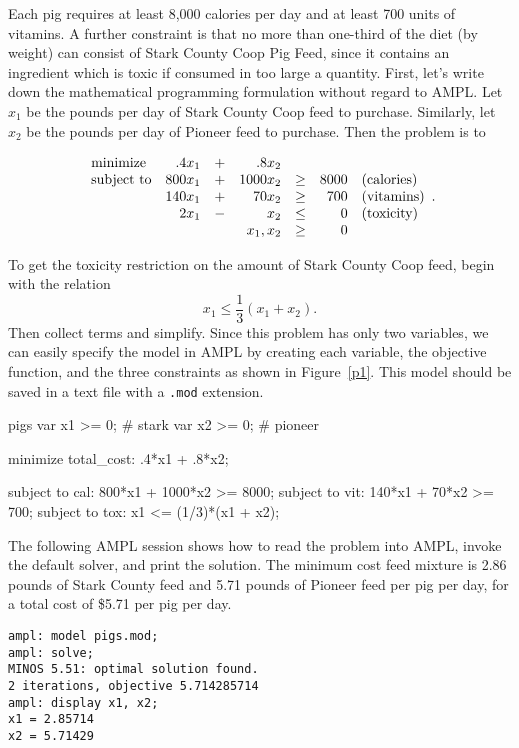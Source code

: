 Each pig requires at least 8,000 calories per day and at least 700
units of vitamins. A further constraint is that no more than one-third
of the diet (by weight) can consist of Stark County Coop Pig Feed,
since it contains an ingredient which is toxic if consumed in too
large a quantity.  First, let's write down the mathematical
programming formulation without regard to AMPL. Let $x_1$ be the
pounds per day of Stark County Coop feed to purchase. Similarly, let
$x_2$ be the pounds per day of Pioneer feed to purchase. Then the
problem is to 

\[
\begin{array}{lrrrrrl}
\textrm{minimize}   & .4x_1 & + & .8x_2 &  &  &  \\
\textrm{subject to} & 800x_1 & + & 1000x_2 & \geq & 8000 & \textrm{(calories)} \\
                    & 140x_1 & + & 70x_2   & \geq & 700  & \textrm{(vitamins)} \\
					& 2x_1   & - & x_2     & \leq & 0    & \textrm{(toxicity)} \\
\multicolumn{4}{r}{x_1,x_2}& \geq & 0 &
\end{array}.
\]

To get the toxicity restriction on the amount of Stark County Coop
feed, begin with the relation
\[
x_1 \leq \frac{1}{3}(x_1 + x_2).
\]
Then collect terms and simplify.  Since this problem has only two
variables, we can easily specify the model in AMPL by creating each
variable, the objective function, and the three constraints as shown
in Figure~\ref{p1}. This model should be saved in a text file with a
\texttt{.mod} extension.

\begin{SaveVerbatim}{pigs}
var x1 >= 0;  # stark
var x2 >= 0;  # pioneer

minimize total_cost: .4*x1 + .8*x2;

subject to cal: 800*x1 + 1000*x2 >= 8000;
subject to vit: 140*x1 + 70*x2 >= 700;
subject to tox: x1 <= (1/3)*(x1 + x2);
\end{SaveVerbatim}

\begin{figure}
\end{figure}

The following AMPL session shows how to read the problem into AMPL,
invoke the default solver, and print the solution. The minimum cost
feed mixture is 2.86 pounds of Stark County feed and 5.71 pounds of
Pioneer feed per pig per day, for a total cost of \$5.71 per pig per
day.
\begin{Verbatim}[samepage=true]
ampl: model pigs.mod;
ampl: solve;
MINOS 5.51: optimal solution found.
2 iterations, objective 5.714285714
ampl: display x1, x2;
x1 = 2.85714
x2 = 5.71429
\end{Verbatim}

